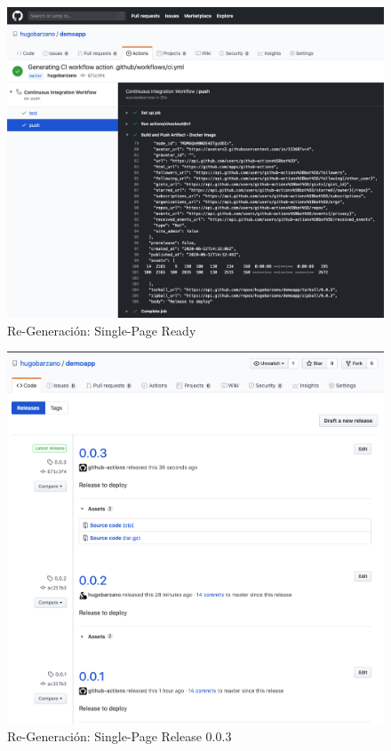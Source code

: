 \documentclass[a4paper,11pt]{book}
\begin{document}
   \begin{figure}[H]
\centering
\includegraphics[scale=0.3]{imagenes/casouso_a/4_5.png}
\caption{  Re-Generación: Single-Page Ready }
\label{4_5}
\end{figure}


   \begin{figure}[H]
\centering
\includegraphics[scale=0.27]{imagenes/casouso_a/4_6.png}
\caption{  Re-Generación: Single-Page Release 0.0.3 }
\label{4_6}
\end{figure}
\end{document}
